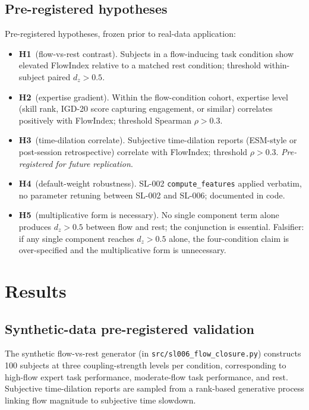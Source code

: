 \documentclass[11pt,a4paper]{article}
\begin{document}
\subsection{Pre-registered hypotheses}\label{sec:methods-prereg}

Pre-registered hypotheses, frozen prior to real-data application:

\begin{itemize}\itemsep0pt
\item \textbf{H1}~(flow-vs-rest contrast). Subjects in a flow-inducing task condition show elevated FlowIndex relative to a matched rest condition; threshold within-subject paired $d_z > 0.5$.
\item \textbf{H2}~(expertise gradient). Within the flow-condition cohort, expertise level (skill rank, IGD-20 score capturing engagement, or similar) correlates positively with FlowIndex; threshold Spearman $\rho > 0.3$.
\item \textbf{H3}~(time-dilation correlate). Subjective time-dilation reports (ESM-style or post-session retrospective) correlate with FlowIndex; threshold $\rho > 0.3$. \emph{Pre-registered for future replication}.
\item \textbf{H4}~(default-weight robustness). SL-002 \texttt{compute\_features} applied verbatim, no parameter retuning between SL-002 and SL-006; documented in code.
\item \textbf{H5}~(multiplicative form is necessary). No single component term alone produces $d_z > 0.5$ between flow and rest; the conjunction is essential. Falsifier: if any single component reaches $d_z > 0.5$ alone, the four-condition claim is over-specified and the multiplicative form is unnecessary.
\end{itemize}

\section{Results}\label{sec:results}

\subsection{Synthetic-data pre-registered validation}\label{sec:results-synthetic}

The synthetic flow-vs-rest generator (in \texttt{src/sl006\_flow\_closure.py}) constructs 100 subjects at three coupling-strength levels per condition, corresponding to high-flow expert task performance, moderate-flow task performance, and rest. Subjective time-dilation reports are sampled from a rank-based generative process linking flow magnitude to subjective time slowdown.
\end{document}
